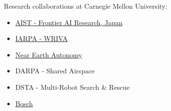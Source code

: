 Research collaborations at Carnegie Mellon University:
\begin{itemize}
  \item \href{https://frontia-ai.go.jp/en/}{AIST - Frontier AI Research, Japan}
  \item \href{https://www.iarpa.gov/research-programs/wriva}{IARPA - WRIVA}
  \item \href{https://www.nearearth.aero/}{Near Earth Autonomy}
  \item DARPA - Shared Airspace
  \item DSTA - Multi-Robot Search \& Rescue
  \item \href{https://www.bosch.com/research/}{Bosch}
\end{itemize}
